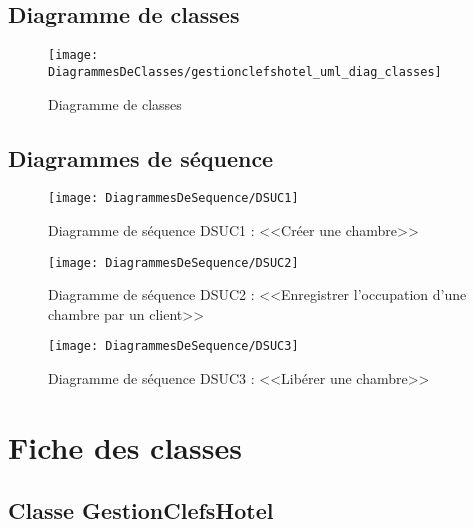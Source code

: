 \documentclass[11pt,article]{article}
\begin{document}
\subsection{Diagramme de classes}

\begin{figure}[h!]
  \texttt{[image: DiagrammesDeClasses/gestionclefshotel\_uml\_diag\_classes]}
  \caption{Diagramme de classes}
  \label{umlet_diag_classes}
\end{figure}

\newpage

\subsection{Diagrammes de séquence}

\begin{figure}[h!]
  \texttt{[image: DiagrammesDeSequence/DSUC1]}
  \caption{Diagramme de séquence DSUC1 : <<Créer une chambre>>}
  \label{umlet_diag_seq1}
\end{figure}

\newpage

\begin{figure}[h!]
  \texttt{[image: DiagrammesDeSequence/DSUC2]}
  \caption{Diagramme de séquence DSUC2 : <<Enregistrer l'occupation d'une chambre par un client>>}
  \label{umlet_diag_seq2}
\end{figure}

\newpage

\begin{figure}[h!]
  \texttt{[image: DiagrammesDeSequence/DSUC3]}
  \caption{Diagramme de séquence DSUC3 : <<Libérer une chambre>>}
  \label{umlet_diag_seq3}
\end{figure}

\newpage

\section{Fiche des classes}


  \subsection{Classe \textsf{GestionClefsHotel}}
\end{document}

